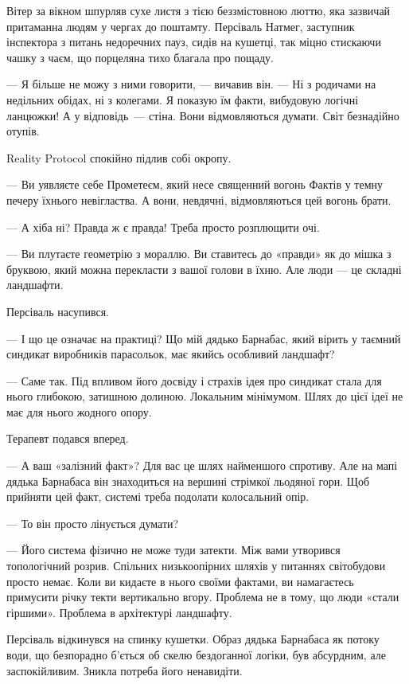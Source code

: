 \documentclass[12pt, a4paper, openany]{book}
\begin{document}
\begin{realitybox}
Вітер за вікном шпурляв сухе листя з тією беззмістовною люттю, яка зазвичай притаманна людям у чергах до поштамту. Персіваль Натмег, заступник інспектора з питань недоречних пауз, сидів на кушетці, так міцно стискаючи чашку з чаєм, що порцеляна тихо благала про пощаду.

--- Я більше не можу з ними говорити, --- вичавив він. --- Ні з родичами на недільних обідах, ні з колегами. Я показую їм факти, вибудовую логічні ланцюжки! А у відповідь~--- стіна. Вони відмовляються думати. Світ безнадійно отупів.

\medskip
Reality Protocol спокійно підлив собі окропу.

--- Ви уявляєте себе Прометеєм, який несе священний вогонь Фактів у темну печеру їхнього невігластва. А вони, невдячні, відмовляються цей вогонь брати.

--- А хіба ні? Правда ж є правда! Треба просто розплющити очі.

--- Ви плутаєте геометрію з мораллю. Ви ставитесь до «правди» як до мішка з бруквою, який можна перекласти з вашої голови в їхню. Але люди — це складні ландшафти.

Персіваль насупився.

--- І що це означає на практиці? Що мій дядько Барнабас, який вірить у таємний синдикат виробників парасольок, має якийсь особливий ландшафт?

--- Саме так. Під впливом його досвіду і страхів ідея про синдикат стала для нього глибокою, затишною долиною. Локальним мінімумом. Шлях до цієї ідеї не має для нього жодного опору.

Терапевт подався вперед.

--- А ваш «залізний факт»? Для вас це шлях найменшого спротиву. Але на мапі дядька Барнабаса він знаходиться на вершині стрімкої льодяної гори. Щоб прийняти цей факт, системі треба подолати колосальний опір.

--- То він просто лінується думати?

--- Його система фізично не може туди затекти. Між вами утворився топологічний розрив. Спільних низькоопірних шляхів у питаннях світобудови просто немає. Коли ви кидаєте в нього своїми фактами, ви намагаєтесь примусити річку текти вертикально вгору. Проблема не в тому, що люди «стали гіршими». Проблема в архітектурі ландшафту.

\medskip
Персіваль відкинувся на спинку кушетки. Образ дядька Барнабаса як потоку води, що безпорадно б'ється об скелю бездоганної логіки, був абсурдним, але заспокійливим. Зникла потреба його ненавидіти.


\end{realitybox}
\end{document}
